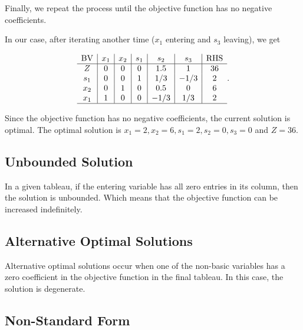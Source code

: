\documentclass{report}
\begin{document}
Finally, we repeat the process until the objective function has no negative coefficients.

In our case, after iterating another time ($x_1$ entering and $s_3$ leaving), we get

\[
	\begin{array}{c|c|c|c|c|c|c}
		\text{BV} & x_1 & x_2 & s_1 & s_2  & s_3  & \text{RHS} \\
		\hline
		Z         & 0   & 0   & 0   & 1.5  & 1    & 36         \\
		s_1       & 0   & 0   & 1   & 1/3  & -1/3 & 2          \\
		x_2       & 0   & 1   & 0   & 0.5  & 0    & 6          \\
		x_1       & 1   & 0   & 0   & -1/3 & 1/3  & 2          \\
		\hline
	\end{array}
	.\]

Since the objective function has no negative coefficients, the current solution is optimal. The optimal solution is $x_1 = 2, x_2 = 6, s_1 = 2, s_2 = 0, s_3 = 0$ and $Z = 36$.

\subsection{Unbounded Solution}

In a given tableau, if the entering variable has all zero entries in its column, then the solution is unbounded. Which means that the objective function can be increased indefinitely.

\subsection{Alternative Optimal Solutions}

Alternative optimal solutions occur when one of the non-basic variables has a zero coefficient in the objective function in the final tableau. In this case, the solution is degenerate.

\subsection{Non-Standard Form}
\end{document}
